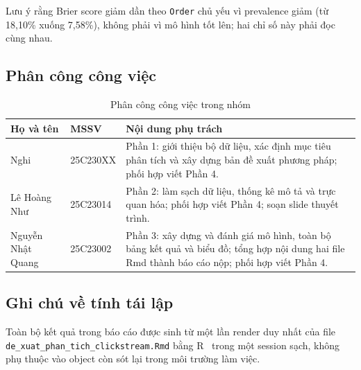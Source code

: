 Lưu ý rằng Brier score giảm dần theo \texttt{Order} chủ yếu vì prevalence giảm
(từ 18,10\% xuống 7,58\%), không phải vì mô hình tốt lên; hai chỉ số này phải đọc
cùng nhau.

\subsection{Phân công công việc}

\begin{table}[H]
\centering
\caption{Phân công công việc trong nhóm}
\label{tab:assignment}
\small
\begin{tabular}{>{\raggedright\arraybackslash}p{}
                >{\raggedright\arraybackslash}p{}
                >{\raggedright\arraybackslash}p{}}
\toprule
\textbf{Họ và tên} & \textbf{MSSV} & \textbf{Nội dung phụ trách} \\
\midrule
Nghi & 25C230XX &
Phần 1: giới thiệu bộ dữ liệu, xác định mục tiêu phân tích và xây dựng bản đề
xuất phương pháp; phối hợp viết Phần 4. \\[2pt]
Lê Hoàng Như & 25C23014 &
Phần 2: làm sạch dữ liệu, thống kê mô tả và trực quan hóa; phối hợp viết Phần 4;
soạn slide thuyết trình. \\[2pt]
Nguyễn Nhật Quang & 25C23002 &
Phần 3: xây dựng và đánh giá mô hình, toàn bộ bảng kết quả và biểu đồ; tổng hợp
nội dung hai file Rmd thành báo cáo nộp; phối hợp viết Phần 4. \\
\bottomrule
\end{tabular}
\end{table}


\subsection{Ghi chú về tính tái lập}

Toàn bộ kết quả trong báo cáo được sinh từ một lần render duy nhất của file
\texttt{de\_xuat\_phan\_tich\_clickstream.Rmd} bằng R~\cite{rcore2026} trong một
session sạch, không phụ thuộc vào object còn sót lại trong môi trường làm việc.

